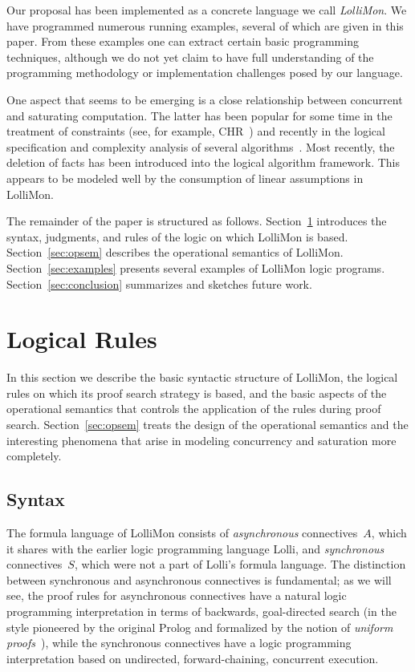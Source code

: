 \documentclass{sig-alt}
\begin{document}
Our proposal has been implemented as a concrete language we call
\emph{LolliMon}.  We have programmed numerous running examples,
several of which are given in this paper.  From these examples one can
extract certain basic programming techniques, although we do not yet
claim to have full understanding of the programming methodology or
implementation challenges posed by our language.

One aspect that seems to be emerging is a close relationship between
concurrent and saturating computation.  The latter has been popular
for some time in the treatment of constraints (see, for example,
CHR~\cite{Fruehwirth98jlp}) and recently in the logical specification
and complexity analysis of several
algorithms~\cite{Ganzinger01ijcar,Mcallester02jacm}.  Most recently,
the deletion of facts has been introduced into the logical algorithm
framework. This appears to be modeled well by the consumption of
linear assumptions in LolliMon.

The remainder of the paper is structured as follows.
Section~\ref{sec:logical-rules} introduces the syntax, judgments, and
  rules of the logic on which LolliMon is based.
Section~\ref{sec:opsem} describes the operational semantics of LolliMon.
Section~\ref{sec:examples} presents several examples of LolliMon logic
  programs.
Section~\ref{sec:conclusion} summarizes and sketches future work.

\section{Logical Rules}
\label{sec:logical-rules}

In this section
 we describe the basic syntactic structure of LolliMon,
the logical rules on which its proof search strategy is based, and the
basic aspects of the operational semantics that controls the application of
the rules during proof search. Section~\ref{sec:opsem} treats the design
of the operational semantics and the interesting phenomena that arise
in modeling concurrency and saturation more completely.

\subsection{Syntax}
The formula language of LolliMon consists of \emph{asynchronous}
connectives~$A$, which it shares with the earlier logic programming
language Lolli, and \emph{synchronous} connectives~$S$, which were not
a part of Lolli's formula language.  The distinction between
synchronous and asynchronous connectives is fundamental; as we will
see, the proof rules for asynchronous connectives have a natural logic
programming interpretation in terms of backwards, goal-directed search
(in the style pioneered by the original Prolog and formalized by the
notion of \emph{uniform proofs}~\cite{Miller91apal}), while the
synchronous connectives have a logic programming interpretation based
on undirected, forward-chaining, concurrent execution.
\end{document}
